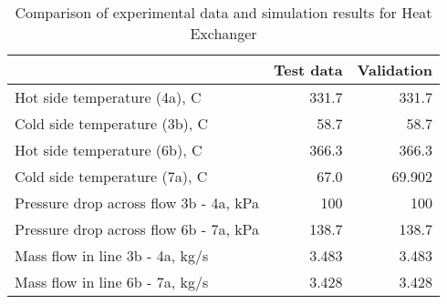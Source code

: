 \begin{table}
\label{tab:Comparison}
\caption{Comparison of experimental data and simulation results for Heat Exchanger}
\begin{center}
\begin{tabulary}{0.9\textwidth}{LRR}
\toprule
& Test data \cite{Iverson_2013}  & Validation \\
\midrule
Hot side temperature (4a), C & 331.7 & 331.7 \\
Cold side temperature (3b), C & 58.7 & 58.7 \\
Hot side temperature (6b), C & 366.3 & 366.3 \\
Cold side temperature (7a), C & 67.0 & 69.902 \\
Pressure drop across flow 3b - 4a, kPa & 100 & 100 \\
Pressure drop across flow 6b - 7a, kPa & 138.7 & 138.7 \\
Mass flow in line 3b - 4a, kg/s & 3.483 & 3.483 \\
Mass flow in line 6b - 7a, kg/s & 3.428 & 3.428 \\
\bottomrule
\end{tabulary}
\end{center}
\end{table}